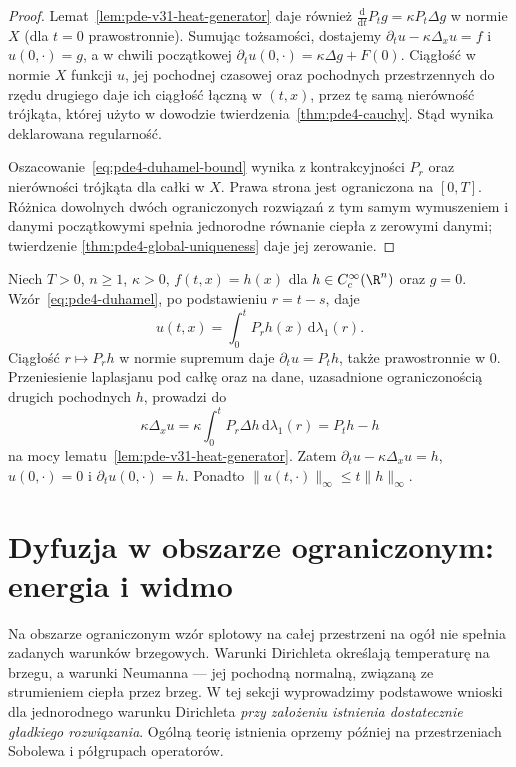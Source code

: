 \begin{proof}
Lemat~\ref{lem:pde-v31-heat-generator} daje również
$\frac{\mathrm d}{\mathrm dt}P_tg=\kappa P_t\Delta g$
w normie $X$ (dla $t=0$ prawostronnie).
Sumując tożsamości, dostajemy
$\partial_tu-\kappa\Delta_xu=f$ i $u(0,\cdot)=g$,
a w chwili początkowej
$\partial_tu(0,\cdot)=\kappa\Delta g+F(0)$.
Ciągłość w normie $X$ funkcji $u$, jej pochodnej
czasowej oraz pochodnych przestrzennych do rzędu
drugiego daje ich ciągłość łączną w $(t,x)$,
przez tę samą nierówność trójkąta, której użyto
w dowodzie twierdzenia~\ref{thm:pde4-cauchy}.
Stąd wynika deklarowana regularność.

Oszacowanie~\eqref{eq:pde4-duhamel-bound} wynika
z kontrakcyjności $P_r$ oraz nierówności trójkąta
dla całki w $X$. Prawa strona jest ograniczona
na $[0,T]$. Różnica dowolnych dwóch ograniczonych
rozwiązań z tym samym wymuszeniem i danymi
początkowymi spełnia jednorodne równanie ciepła
z zerowymi danymi; twierdzenie
\ref{thm:pde4-global-uniqueness} daje jej zerowanie.
\end{proof}

\begin{przyklad}
Niech $T>0$, $n\geq1$, $\kappa>0$,
$f(t,x)=h(x)$ dla $h\in C_c^\infty(\R^n)$ oraz
$g=0$. Wzór~\eqref{eq:pde4-duhamel}, po podstawieniu
$r=t-s$, daje
\[
 u(t,x)=\int_0^tP_rh(x)\,\mathrm d\lambda_1(r).
\]
Ciągłość $r\mapsto P_rh$ w normie supremum daje
$\partial_tu=P_th$, także prawostronnie w $0$.
Przeniesienie laplasjanu pod całkę oraz na dane,
uzasadnione ograniczonością drugich pochodnych $h$,
prowadzi do
\[
 \kappa\Delta_xu=\kappa\int_0^tP_r\Delta h\,
                       \mathrm d\lambda_1(r)=P_th-h
\]
na mocy lematu~\ref{lem:pde-v31-heat-generator}.
Zatem $\partial_tu-\kappa\Delta_xu=h$,
$u(0,\cdot)=0$ i $\partial_tu(0,\cdot)=h$.
Ponadto $\|u(t,\cdot)\|_\infty\leq t\|h\|_\infty$.
\end{przyklad}

\section{Dyfuzja w obszarze ograniczonym: energia i widmo}
\label{sec:pde4-bounded}

Na obszarze ograniczonym wzór splotowy na całej
przestrzeni na ogół nie spełnia zadanych warunków
brzegowych. Warunki Dirichleta określają temperaturę
na brzegu, a warunki Neumanna --- jej pochodną
normalną, związaną ze strumieniem ciepła przez brzeg.
W tej sekcji wyprowadzimy podstawowe wnioski
dla jednorodnego warunku Dirichleta
\emph{przy założeniu istnienia dostatecznie gładkiego
rozwiązania}. Ogólną teorię istnienia oprzemy później
na przestrzeniach Sobolewa i półgrupach operatorów.

